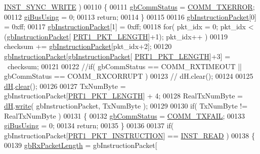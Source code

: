 \begin{DoxyCode}
      \hyperlink{dynamixel_8h_aeaa4b61ee11d45bd1a0cb932d7abaf77}{INST\_SYNC\_WRITE} )
00110     \{
00111         \hyperlink{classdynamixel_a5b603f6bed7ccc595f1f50bd6a6ebbfc}{gbCommStatus} = \hyperlink{dynamixel_8h_a1bd7c7b30db4f56dc80cef65ad38afff}{COMM\_TXERROR};
00112         \hyperlink{classdynamixel_ad10e0e49f5fef04bf789a89c14cc470a}{giBusUsing} = 0;
00113         \textcolor{keywordflow}{return};
00114     \}
00115     
00116     \hyperlink{classdynamixel_afd94dcf01b8e96298727776e222de722}{gbInstructionPacket}[0] = 0xff;
00117     \hyperlink{classdynamixel_afd94dcf01b8e96298727776e222de722}{gbInstructionPacket}[1] = 0xff;
00118     \textcolor{keywordflow}{for}( pkt\_idx = 0; pkt\_idx < (\hyperlink{classdynamixel_afd94dcf01b8e96298727776e222de722}{gbInstructionPacket}[
      \hyperlink{dynamixel_8h_ab24601f91d0364e4b62edad3c2a0a5c4}{PRT1\_PKT\_LENGTH}]+1); pkt\_idx++ )
00119         checksum += \hyperlink{classdynamixel_afd94dcf01b8e96298727776e222de722}{gbInstructionPacket}[pkt\_idx+2];
00120     \hyperlink{classdynamixel_afd94dcf01b8e96298727776e222de722}{gbInstructionPacket}[\hyperlink{classdynamixel_afd94dcf01b8e96298727776e222de722}{gbInstructionPacket}[
      \hyperlink{dynamixel_8h_ab24601f91d0364e4b62edad3c2a0a5c4}{PRT1\_PKT\_LENGTH}]+3] = ~checksum;
00121     
00122     \textcolor{comment}{//if( gbCommStatus == COMM\_RXTIMEOUT || gbCommStatus == COMM\_RXCORRUPT )}
00123     \textcolor{comment}{//  dH.clear();}
00124 
00125     \hyperlink{classdynamixel_ae003cc90ada6d7b70eaa4ea9d42d4deb}{dH}.\hyperlink{classdxl__hal_a004eedde5af69219d7288ec8ea97c89f}{clear}();
00126 
00127     TxNumByte = gbInstructionPacket[\hyperlink{dynamixel_8h_ab24601f91d0364e4b62edad3c2a0a5c4}{PRT1\_PKT\_LENGTH}] + 4;
00128     RealTxNumByte = \hyperlink{classdynamixel_ae003cc90ada6d7b70eaa4ea9d42d4deb}{dH}.\hyperlink{classdxl__hal_a90106970438fb0ab65852730a1c0776a}{write}( gbInstructionPacket, TxNumByte );
00129 
00130     \textcolor{keywordflow}{if}( TxNumByte != RealTxNumByte )
00131     \{
00132         \hyperlink{classdynamixel_a5b603f6bed7ccc595f1f50bd6a6ebbfc}{gbCommStatus} = \hyperlink{dynamixel_8h_af88390c8be18c4079e65fd07b8d553be}{COMM\_TXFAIL};
00133         \hyperlink{classdynamixel_ad10e0e49f5fef04bf789a89c14cc470a}{giBusUsing} = 0;
00134         \textcolor{keywordflow}{return};
00135     \}
00136 
00137     \textcolor{keywordflow}{if}( gbInstructionPacket[\hyperlink{dynamixel_8h_a3da1d083c018994fb0c859f4e06e1f78}{PRT1\_PKT\_INSTRUCTION}] == 
      \hyperlink{dynamixel_8h_a60599b6587736bb05efb8ea3c5e5f87f}{INST\_READ} )
00138     \{
00139         \hyperlink{classdynamixel_a333686e1b5903d16c41df8172b6bd5a8}{gbRxPacketLength} =  gbInstructionPacket[

\end{DoxyCode}
